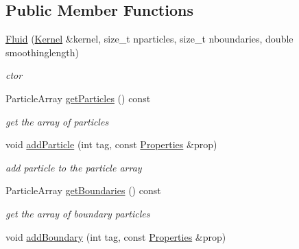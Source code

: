 \subsection*{\-Public \-Member \-Functions}
\begin{DoxyCompactItemize}
\item 
\hyperlink{classFluid_ae4aecca54a935e361157859de51ce2e3}{\-Fluid} (\hyperlink{classKernel}{\-Kernel} \&kernel, size\-\_\-t nparticles, size\-\_\-t nboundaries, double smoothinglength)
\begin{DoxyCompactList}\small\item\em ctor \end{DoxyCompactList}\item 
\hypertarget{classFluid_a653f9edf3a6c53ec1f42e7f41cdc87a8}{\-Particle\-Array \hyperlink{classFluid_a653f9edf3a6c53ec1f42e7f41cdc87a8}{get\-Particles} () const }\label{classFluid_a653f9edf3a6c53ec1f42e7f41cdc87a8}

\begin{DoxyCompactList}\small\item\em get the array of particles \end{DoxyCompactList}\item 
\hypertarget{classFluid_a128d7ad9ce3a78bc8ef039702f9c2706}{void \hyperlink{classFluid_a128d7ad9ce3a78bc8ef039702f9c2706}{add\-Particle} (int tag, const \hyperlink{structProperties}{\-Properties} \&prop)}\label{classFluid_a128d7ad9ce3a78bc8ef039702f9c2706}

\begin{DoxyCompactList}\small\item\em add particle to the particle array \end{DoxyCompactList}\item 
\hypertarget{classFluid_a8c9d7de21e341ec6344e78cb2ca21baf}{\-Particle\-Array \hyperlink{classFluid_a8c9d7de21e341ec6344e78cb2ca21baf}{get\-Boundaries} () const }\label{classFluid_a8c9d7de21e341ec6344e78cb2ca21baf}

\begin{DoxyCompactList}\small\item\em get the array of boundary particles \end{DoxyCompactList}\item 
\hypertarget{classFluid_a366795e3ce9fe395ee33febd3813b6f7}{void \hyperlink{classFluid_a366795e3ce9fe395ee33febd3813b6f7}{add\-Boundary} (int tag, const \hyperlink{structProperties}{\-Properties} \&prop)}\label{classFluid_a366795e3ce9fe395ee33febd3813b6f7}


\end{DoxyCompactItemize}
